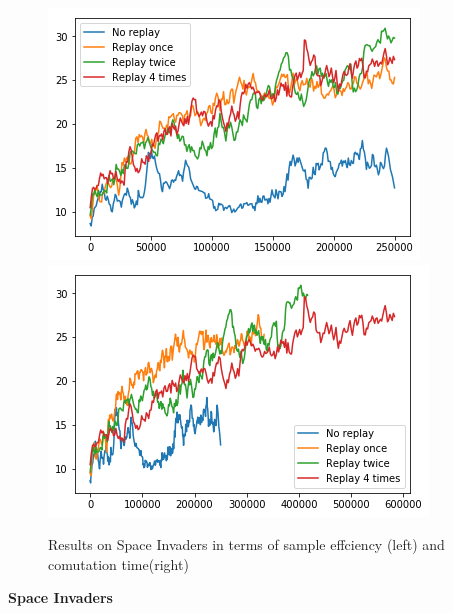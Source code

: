 \begin{figure}[h]
\includegraphics[scale=0.55]{bilder/spaceinvbyonline.png}
\includegraphics[scale=0.55]{bilder/spaceinvbytime.png}
\caption{ Results on Space Invaders in terms of sample effciency (left) and comutation time(right)}
\end{figure}

\pagebreak
\textbf{Space Invaders}

